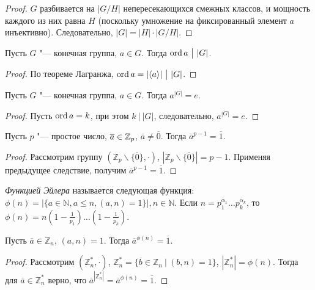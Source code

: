\begin{proof}
	$G$ разбивается на $|G/H|$ непересекающихся смежных классов, и мощность каждого из них равна $H$ (поскольку умножение на фиксированный элемент $a$ инъективно). Следовательно, $|G| = |H|\cdot|G/H|$.
\end{proof}

\begin{corollary}
	Пусть $G$ "--- конечная группа, $a \in G$. Тогда $\operatorname{ord}{a}~\big|~|G|$.
\end{corollary}

\begin{proof}
	По теореме Лагранжа, $\operatorname{ord}{a} = |\langle a\rangle|~\big|~|G|$.
\end{proof}

\begin{corollary}
	Пусть $G$ "--- конечная группа, $a \in G$. Тогда $a^{|G|} = e$.
\end{corollary}

\begin{proof}
	Пусть $\operatorname{ord}{a} = k$, при этом $k~\big|~|G|$, следовательно, $a^{|G|} = e$.
\end{proof}

\begin{corollary}
	Пусть $p$ "--- простое число, $\overline{a} \hm{\in} \mathbb{Z}_p$, $\overline{a} \ne \overline{0}$. Тогда $\overline{a}^{p-1} = \overline{1}$.
\end{corollary}

\begin{proof}
	Рассмотрим группу $(\mathbb{Z}_p\backslash\{\overline{0}\}, \cdot)$, $|\mathbb{Z}_p\backslash\{\overline{0}\}| = p - 1$. Применяя предыдущее следствие, получим $\overline{a}^{p - 1} = \overline{1}$.
\end{proof}

\begin{definition}
	\textit{Функцией Эйлера} называется следующая функция: $\phi(n) = |\{a \in \mathbb{N}, a \le n, (a, n) = 1\}|, n \in \mathbb{N}$. Если $n = p_1^{\alpha_1}\dots p_k^{\alpha_k}$, то $\phi(n) = n(1 - \frac{1}{p_1})\dots(1 - \frac{1}{p_k})$.
\end{definition}

\begin{theorem}[Эйлера]
	Пусть $\overline{a} \in \mathbb{Z}_n$, $(a, n) = 1$. Тогда $\overline{a}^{\phi(n)} = \overline{1}$.
\end{theorem}

\begin{proof}
	Рассмотрим $(\mathbb{Z}_n^*, \cdot)$, $\mathbb{Z}_n^* = \{\overline{b} \in \mathbb{Z}_n~|~(b, n) = 1\}$, $|\mathbb{Z}_n^*| = \phi(n)$. Тогда для $\overline{a} \in \mathbb{Z}_n^*$ верно, что $\overline{a}^{|\mathbb{Z}_n^*|} = \overline{a}^{\phi(n)} = \overline{1}$.
\end{proof}

